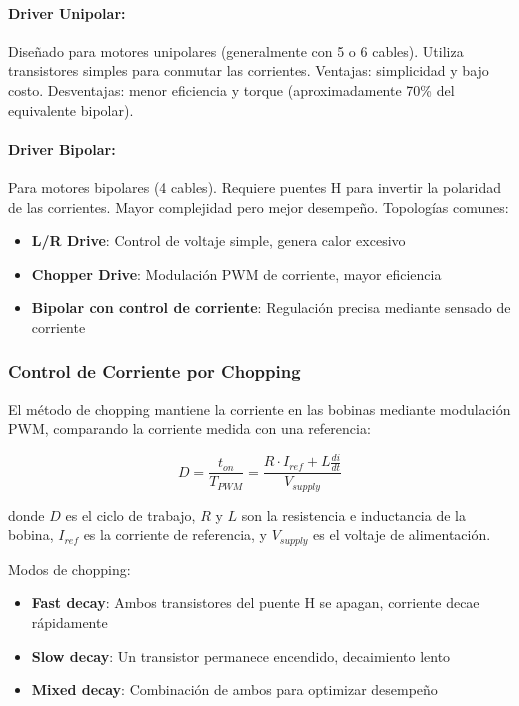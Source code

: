 \paragraph{Driver Unipolar:}

Diseñado para motores unipolares (generalmente con 5 o 6 cables). Utiliza transistores simples para conmutar las corrientes. Ventajas: simplicidad y bajo costo. Desventajas: menor eficiencia y torque (aproximadamente 70\% del equivalente bipolar).

\paragraph{Driver Bipolar:}

Para motores bipolares (4 cables). Requiere puentes H para invertir la polaridad de las corrientes. Mayor complejidad pero mejor desempeño. Topologías comunes:

\begin{itemize}
    \item \textbf{L/R Drive}: Control de voltaje simple, genera calor excesivo
    \item \textbf{Chopper Drive}: Modulación PWM de corriente, mayor eficiencia
    \item \textbf{Bipolar con control de corriente}: Regulación precisa mediante sensado de corriente
\end{itemize}

\subsubsection{Control de Corriente por Chopping}

El método de chopping mantiene la corriente en las bobinas mediante modulación PWM, comparando la corriente medida con una referencia:

\begin{equation}
D = \frac{t_{on}}{T_{PWM}} = \frac{R \cdot I_{ref} + L \frac{di}{dt}}{V_{supply}}
\end{equation}

donde $D$ es el ciclo de trabajo, $R$ y $L$ son la resistencia e inductancia de la bobina, $I_{ref}$ es la corriente de referencia, y $V_{supply}$ es el voltaje de alimentación.

Modos de chopping:
\begin{itemize}
    \item \textbf{Fast decay}: Ambos transistores del puente H se apagan, corriente decae rápidamente
    \item \textbf{Slow decay}: Un transistor permanece encendido, decaimiento lento
    \item \textbf{Mixed decay}: Combinación de ambos para optimizar desempeño
\end{itemize}


